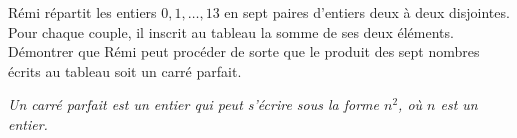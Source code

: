 Rémi répartit les entiers $0, 1, \dots , 13$ en sept paires d'entiers deux à deux disjointes. Pour chaque couple, il inscrit au tableau la somme de ses deux éléments. Démontrer que Rémi peut procéder de sorte que le produit des sept nombres écrits au tableau soit un carré parfait.

\emph{Un carré parfait est un entier qui peut s'écrire sous la forme $n^2$, où $n$ est un entier.}